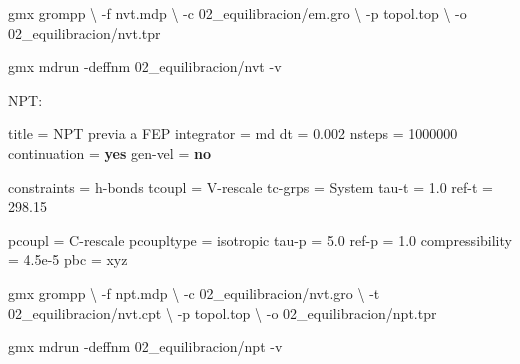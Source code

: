 \documentclass[
  spanish,
  11pt,
  a4paper]{article}
\newenvironment{Shaded}{\begin{snugshade}}{\end{snugshade}}
\newcommand{\AttributeTok}[1]{\textcolor[rgb]{0.13,0.29,0.53}{#1}}
\newcommand{\DataTypeTok}[1]{\textcolor[rgb]{0.13,0.29,0.53}{#1}}
\newcommand{\DecValTok}[1]{\textcolor[rgb]{0.00,0.00,0.81}{#1}}
\newcommand{\ExtensionTok}[1]{#1}
\newcommand{\FloatTok}[1]{\textcolor[rgb]{0.00,0.00,0.81}{#1}}
\newcommand{\KeywordTok}[1]{\textcolor[rgb]{0.13,0.29,0.53}{\textbf{#1}}}
\newcommand{\NormalTok}[1]{#1}
\newcommand{\OtherTok}[1]{\textcolor[rgb]{0.56,0.35,0.01}{#1}}
\newcommand{\StringTok}[1]{\textcolor[rgb]{0.31,0.60,0.02}{#1}}
\begin{document}
\begin{Shaded}
\begin{Highlighting}[]
\ExtensionTok{gmx}\NormalTok{ grompp }\DataTypeTok{\textbackslash{}}
    \AttributeTok{{-}f}\NormalTok{ nvt.mdp }\DataTypeTok{\textbackslash{}}
    \AttributeTok{{-}c}\NormalTok{ 02\_equilibracion/em.gro }\DataTypeTok{\textbackslash{}}
    \AttributeTok{{-}p}\NormalTok{ topol.top }\DataTypeTok{\textbackslash{}}
    \AttributeTok{{-}o}\NormalTok{ 02\_equilibracion/nvt.tpr}

\ExtensionTok{gmx}\NormalTok{ mdrun }\AttributeTok{{-}deffnm}\NormalTok{ 02\_equilibracion/nvt }\AttributeTok{{-}v}
\end{Highlighting}
\end{Shaded}

NPT:

\begin{Shaded}
\begin{Highlighting}[]
\DataTypeTok{title            }\OtherTok{=}\StringTok{ NPT previa a FEP}
\DataTypeTok{integrator       }\OtherTok{=}\StringTok{ md}
\DataTypeTok{dt               }\OtherTok{=}\StringTok{ }\FloatTok{0.002}
\DataTypeTok{nsteps           }\OtherTok{=}\StringTok{ }\DecValTok{1000000}
\DataTypeTok{continuation     }\OtherTok{=}\StringTok{ }\KeywordTok{yes}
\DataTypeTok{gen{-}vel          }\OtherTok{=}\StringTok{ }\KeywordTok{no}

\DataTypeTok{constraints      }\OtherTok{=}\StringTok{ h{-}bonds}
\DataTypeTok{tcoupl           }\OtherTok{=}\StringTok{ V{-}rescale}
\DataTypeTok{tc{-}grps          }\OtherTok{=}\StringTok{ System}
\DataTypeTok{tau{-}t            }\OtherTok{=}\StringTok{ }\FloatTok{1.0}
\DataTypeTok{ref{-}t            }\OtherTok{=}\StringTok{ }\FloatTok{298.15}

\DataTypeTok{pcoupl            }\OtherTok{=}\StringTok{ C{-}rescale}
\DataTypeTok{pcoupltype        }\OtherTok{=}\StringTok{ isotropic}
\DataTypeTok{tau{-}p             }\OtherTok{=}\StringTok{ }\FloatTok{5.0}
\DataTypeTok{ref{-}p             }\OtherTok{=}\StringTok{ }\FloatTok{1.0}
\DataTypeTok{compressibility   }\OtherTok{=}\StringTok{ 4.5e{-}5}
\DataTypeTok{pbc               }\OtherTok{=}\StringTok{ xyz}
\end{Highlighting}
\end{Shaded}

\begin{Shaded}
\begin{Highlighting}[]
\ExtensionTok{gmx}\NormalTok{ grompp }\DataTypeTok{\textbackslash{}}
    \AttributeTok{{-}f}\NormalTok{ npt.mdp }\DataTypeTok{\textbackslash{}}
    \AttributeTok{{-}c}\NormalTok{ 02\_equilibracion/nvt.gro }\DataTypeTok{\textbackslash{}}
    \AttributeTok{{-}t}\NormalTok{ 02\_equilibracion/nvt.cpt }\DataTypeTok{\textbackslash{}}
    \AttributeTok{{-}p}\NormalTok{ topol.top }\DataTypeTok{\textbackslash{}}
    \AttributeTok{{-}o}\NormalTok{ 02\_equilibracion/npt.tpr}

\ExtensionTok{gmx}\NormalTok{ mdrun }\AttributeTok{{-}deffnm}\NormalTok{ 02\_equilibracion/npt }\AttributeTok{{-}v}
\end{Highlighting}
\end{Shaded}
\end{document}
